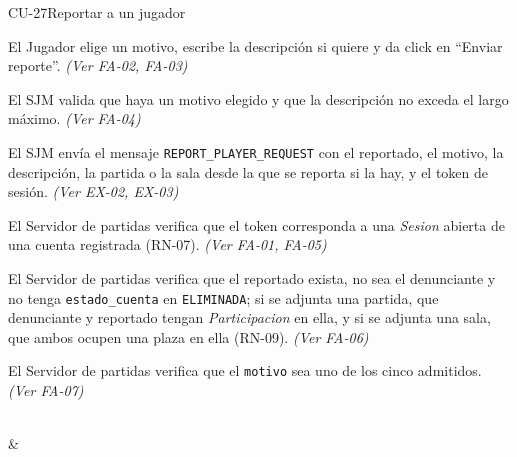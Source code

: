 \begin{fichacu}{CU-27}{Reportar a un jugador}
{\begin{cuenum}[start=1]
      \item El Jugador elige un motivo, escribe la descripción si quiere y da click en ``Enviar reporte''. \textit{(Ver \mbox{FA-02}, \mbox{FA-03})}
      \item El SJM valida que haya un motivo elegido y que la descripción no exceda el largo máximo. \textit{(Ver \mbox{FA-04})}
      \item El SJM envía el mensaje \texttt{REPORT\_\allowbreak{}PLAYER\_\allowbreak{}REQUEST} con el reportado, el motivo, la descripción, la partida o la sala desde la que se reporta si la hay, y el token de sesión. \textit{(Ver \mbox{EX-02}, \mbox{EX-03})}
      \item El Servidor de partidas verifica que el token corresponda a una \textit{Sesion} abierta de una cuenta registrada (\mbox{RN-07}). \textit{(Ver \mbox{FA-01}, \mbox{FA-05})}
      \item El Servidor de partidas verifica que el reportado exista, no sea el denunciante y no tenga \texttt{estado\_\allowbreak{}cuenta} en \texttt{ELIMINADA}; si se adjunta una partida, que denunciante y reportado tengan \textit{Participacion} en ella, y si se adjunta una sala, que ambos ocupen una plaza en ella (\mbox{RN-09}). \textit{(Ver \mbox{FA-06})}
      \item El Servidor de partidas verifica que el \texttt{motivo} sea uno de los cinco admitidos. \textit{(Ver \mbox{FA-07})}
    \end{cuenum}} \\
   & 
\end{fichacu}
